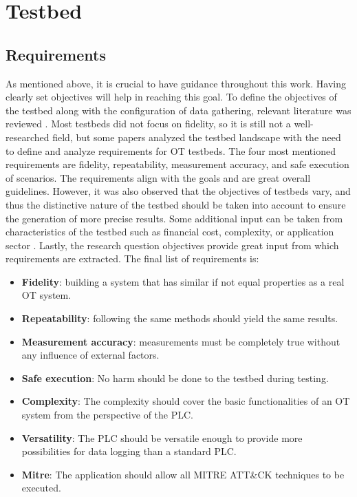 \documentclass[Master,BMR,english]{twbook}
\begin{document}
\section{Testbed}

\subsection{Requirements}

As mentioned above, it is crucial to have guidance throughout this work. Having clearly set objectives will help in reaching this goal. To define the objectives of the testbed along with the configuration of data gathering, relevant literature was reviewed \cite{qassim_survey_2017}\cite{pospisil_application_2021}\cite{dehlaghi-ghadim_icssim-framework_2023} . Most testbeds did not focus on fidelity, so it is still not a well-researched field, but some papers analyzed the testbed landscape with the need to define and analyze requirements for OT testbeds\cite{ani_design_2021}. The four most mentioned requirements are fidelity, repeatability, measurement accuracy, and safe execution of scenarios. The requirements align with the goals and are great overall guidelines. However, it was also observed that the objectives of testbeds vary, and thus the distinctive nature of the testbed should be taken into account to ensure the generation of more precise results. Some additional input can be taken from characteristics of the testbed such as financial cost, complexity, or application sector\cite{ani_design_2021} \cite{dehlaghi-ghadim_icssim-framework_2023}. Lastly, the research question objectives provide great input from which requirements are extracted. The final list of requirements is:

\begin{itemize}
    \item \textbf{Fidelity}: building a system that has similar if not equal properties as a real OT system.
    \item \textbf{Repeatability}: following the same methods should yield the same results.
    \item \textbf{Measurement accuracy}: measurements must be completely true without any influence of external factors.
    \item \textbf{Safe execution}: No harm should be done to the testbed during testing.
    \item \textbf{Complexity}: The complexity should cover the basic functionalities of an OT system from the perspective of the PLC. 
    \item \textbf{Versatility}: The PLC should be versatile enough to provide more possibilities for data logging than a standard PLC.
    \item \textbf{Mitre}: The application should allow all MITRE ATT\&CK techniques to be executed. 

\end{itemize}
\end{document}
